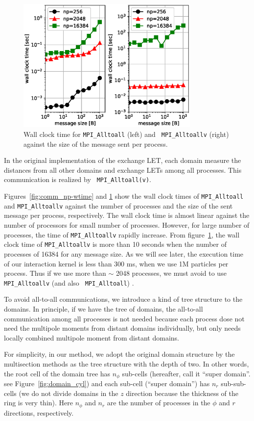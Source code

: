 \documentclass[]{pasj01}
\begin{document}
\begin{figure}
  \centering
  \includegraphics[width=9cm,clip]{./fig/comm_msize-wtime.eps}
  \caption{Wall clock time for {\tt MPI\_Alltoall} (left) and {\tt
      MPI\_Alltoallv} (right) against the size of the message sent per
    process.}
  \label{fig:comm_msize-wtime}
\end{figure}

In the original implementation of the exchange LET, each domain
measure the distances from all other domains and exchange LETs among
all processes. This communication is realized by {\tt
  MPI\_Alltoall(v)}.

Figures~\ref{fig:comm_np-wtime} and \ref{fig:comm_msize-wtime} show
the wall clock times of {\tt MPI\_Alltoall} and {\tt MPI\_Alltoallv}
against the number of processes and the size of the sent message per
process, respectively. The wall clock time is almost linear against
the number of processors for small number of processes. However, for
large number of processes, the time of {\tt MPI\_Alltoallv} rapidly
increase.  From figure~\ref{fig:comm_msize-wtime}, the wall clock time
of {\tt MPI\_Alltoallv} is more than 10 seconds when the number of
processes of 16384 for any message size. As we will see later, the
execution time of our interaction kernel is less than 300 ms, when we
use 1M particles per process. Thus if we use more than $\sim$ 2048
processes, we must avoid to use {\tt MPI\_Alltoallv} (and also {\tt
  MPI\_Alltoall}) .

To avoid all-to-all communications, we introduce a kind of tree
structure to the domains. In principle, if we have the tree of
domains, the all-to-all communication among all processes is not
needed because each process dose not need the multipole moments from
distant domains individually, but only needs locally combined
multipole moment from distant domains.

For simplicity, in our method, we adopt the original domain structure
by the multisection methods as the tree structure with the depth of
two. In other words, the root cell of the domain tree has $n_{\phi}$
sub-cells (hereafter, call it ``super domain''. see
Figure~\ref{fig:domain_cyl}) and each sub-cell (``super domain'') has
$n_{r}$ sub-sub-cells (we do not divide domains in the $z$ direction
because the thickness of the ring is very thin). Here $n_{\phi}$ and
$n_r$ are the number of processes in the $\phi$ and $r$ directions,
respectively.
\end{document}

